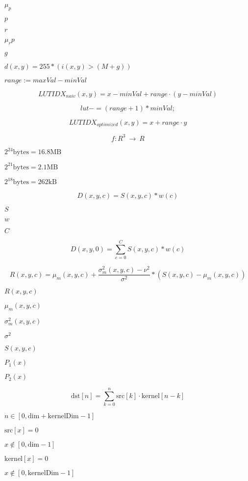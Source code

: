 \documentclass{article}
\begin{document}
$\mu_p$
\pagebreak

$p$
\pagebreak

$r$
\pagebreak

$\mu_r{p}$
\pagebreak

$g$
\pagebreak

$ d(x,y) = 255 * (i(x,y) > (M+g) ) $
\pagebreak

$range := maxVal - minVal$
\pagebreak

\[ LUTIDX_{naiv}(x,y) = x-minVal + range \cdot (y-minVal) \]
\pagebreak

\[ lut -= (range+1)*minVal; \]
\pagebreak

\[ LUTIDX_{optimized}(x,y) = x + range\cdot y \]
\pagebreak

\[ f:R^3~\rightarrow~R \]
\pagebreak

$2^{24} \mbox{bytes} = 16.8\mbox{MB}$
\pagebreak

$2^{21} \mbox{bytes} = 2.1\mbox{MB}$
\pagebreak

$2^{18} \mbox{bytes}=262\mbox{kB}$
\pagebreak

\[ D(x,y,c) = S(x,y,c)*w(c) \]
\pagebreak

$S$
\pagebreak

$w$
\pagebreak

$C$
\pagebreak

\[ D(x,y,0) = \sum\limits_{c=0}^C S(x,y,c)*w(c) \]
\pagebreak

\[ R(x,y,c) = \mu_m(x,y,c) + \frac{\sigma_m^2(x,y,c)-\nu^2}{\sigma^2} * (S(x,y,c) - \mu_m(x,y,c)) \]
\pagebreak

$R(x,y,c)$
\pagebreak

$\mu_m(x,y,c)$
\pagebreak

$\sigma^2_m(x,y,c)$
\pagebreak

$\sigma^2 $
\pagebreak

$S(x,y,c)$
\pagebreak

$P_1(x)$
\pagebreak

$P_2(x)$
\pagebreak

\[ \mbox{dst}[n] = \sum\limits_{k=0}^n \mbox{src}[k] \cdot \mbox{kernel}[n-k] \]
\pagebreak

$ n \in [0,\mbox{dim}+\mbox{kernelDim}-1]$
\pagebreak

$ \mbox{src}[x] = 0 $
\pagebreak

$ x \not\in [0,\mbox{dim}-1] $
\pagebreak

$ \mbox{kernel}[x] = 0$
\pagebreak

$ x \not\in [0,\mbox{kernelDim}-1] $
\pagebreak
\end{document}
